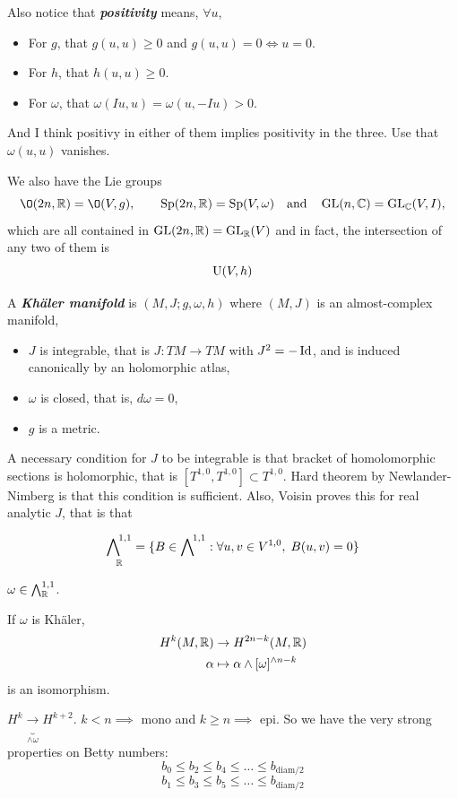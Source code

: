 Also notice that \textbf{\textit{positivity}} means, $\forall u$,
\begin{itemize}
	\item For $g$, that $g(u,u)\geq0$ and $g(u,u)=0\iff u=0$.
	\item For $h$, that $h(u,u)\geq0$.
	\item For $\omega$, that $\omega(Iu,u)=\omega(u,-Iu)>0$.
\end{itemize}
And I think positivy in either of them implies positivity in the three. Use that $\omega(u,u)$ vanishes.

We also have the Lie groups
\[\O(2n,\R)=\O(V,g),\qquad\Sp(2n,\R)=\Sp(V,\omega)\quad\text{and}\quad\GL(n,\C)=\GL_\C(V,I),\]
which are all contained in $\operatorname{GL}(2n,\mathbb{R})=\operatorname{GL}_{\mathbb{R}}(V)$ and in fact, the intersection of any two of them is
\[\operatorname{U}(V,h)\]
\begin{defn}
	A \textbf{\textit{Khäler manifold}} is $(M,J;g,\omega,h)$ where $(M,J)$ is an almost-complex manifold,
	\begin{itemize}
		\item $J$ is integrable, that is $J:TM\to TM$ with $J^2=-\operatorname{Id}$, and is induced canonically by an holomorphic atlas,
		\item $\omega$ is closed, that is, $d\omega=0$,
		\item $g$ is a metric.
	\end{itemize}
\end{defn}
\begin{thm}
	A necessary condition for $J$ to be integrable is that bracket of homolomorphic sections is holomorphic, that is $[T^{1,0},T^{1,0}]\subset T^{1,0}$. Hard theorem by Newlander-Nimberg is that this condition is sufficient. Also, Voisin proves this for real analytic $J$, that is that
\end{thm}
\begin{defn}
	\[\extp^{1,1}_\R=\{B\in\extp^{1,1}:\forall u,v\in V^{1,0},\;B(u,v)=0\}\]
\end{defn}
\begin{claim}
	$\omega\in\bigwedge^{1,1}_{\mathbb{R}}$.
\end{claim}
\begin{thm}
	If $\omega$ is Khäler,
	\begin{align*}
		H^k(M,\mathbb{R})&\to H^{2n-k}(M,\mathbb{R})\\
		\alpha&\mapsto \alpha\wedge[\omega]^{\wedge n-k}
	\end{align*}
	is an isomorphism.
\end{thm}
\begin{coro}
	$H^k\underbrace{\to}_{\wedge\omega} H^{k+2}$. $k<n\implies$ mono and $k\geq n\implies$ epi. So we have the very strong properties on Betty numbers:
	\[b_0\leq b_2\leq b_4\leq \ldots\leq b_{\text{diam}/2}\]
	\[b_1\leq b_3\leq b_5\leq\ldots\leq b_{\text{diam}/2}\]
\end{coro}

